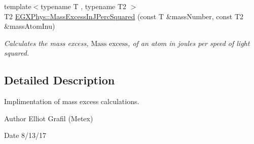 \begin{DoxyCompactItemize}
{\footnotesize template$<$typename T , typename T2 $>$ }\\T2 \mbox{\hyperlink{group___e_g_x_phys-_mass_excess_ga3eb487f438543e950b9c5aece4c5b409}{E\+G\+X\+Phys\+::\+Mass\+Excess\+In\+J\+Perc\+Squared}} (const T \&mass\+Number, const T2 \&mass\+Atom\+Inu)
\begin{DoxyCompactList}\small\item\em Calculates the mass excess, $\text{Mass excess}$, of an atom in joules per speed of light squared. \end{DoxyCompactList}\end{DoxyCompactItemize}


\subsection{Detailed Description}
Implimentation of mass excess calculations. 

\begin{DoxyAuthor}{Author}
Elliot Grafil (Metex) 
\end{DoxyAuthor}
\begin{DoxyDate}{Date}
8/13/17 
\end{DoxyDate}
